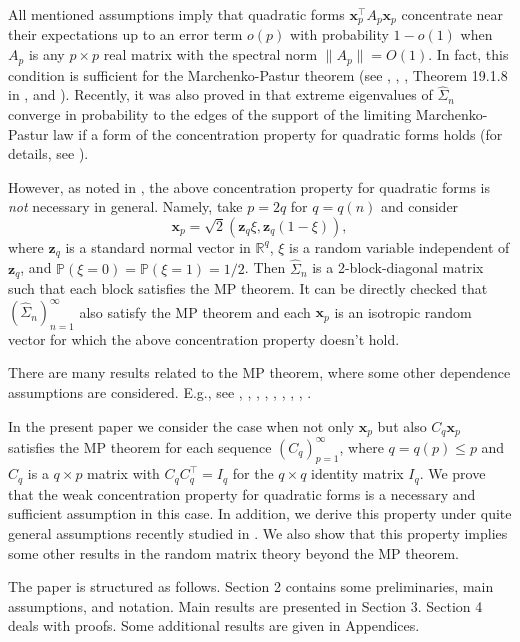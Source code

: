 \documentclass[12pt, a4paper]{article}
\newcommand\x{\mathbf x}
\newcommand\bR{{\mathbb R}}
\newcommand\z{{\mathbf z}}
\newcommand\wh{\widehat }
\newcommand\p{{\mathbb P}}
\begin{document}
All mentioned assumptions imply that quadratic forms $\x_p^\top A_p\x_p$ concentrate near their expectations up to an error term $o( p)$ with probability $1-o(1)$  when $A_p$ is any $p\times p$ real matrix with the spectral norm $\|A_p\|=O(1)$. In fact, this condition is sufficient for the Marchenko-Pastur theorem  (see \cite{BZ}, \cite{G}, \cite{PP}, Theorem 19.1.8 in \cite{PS}, and \cite{Y}).
Recently, it was also proved in \cite{CT} that extreme eigenvalues of $\wh\Sigma_n$ converge in probability to the edges of the  support of the limiting Marchenko-Pastur law if a form of the concentration property for quadratic forms holds (for details, see \cite{CT}). 


However, as noted in \cite{A}, the above concentration property for quadratic forms   is {\it not} necessary in general. Namely, take $p=2q$ for  $q=q(n)$ and consider \[\x_p=\sqrt{2}(\z_q \xi, \z_q (1-\xi)),\]
where $\z_q$ is a standard normal vector in $\bR^q$, $\xi$ is a random variable independent of $\z_q$,  and $\p(\xi=0)=\p(\xi=1)=1/2$. Then $\wh\Sigma_n$ is a 2-block-diagonal matrix such that each block satisfies the MP theorem. It can be directly checked that $(\wh\Sigma_n)_{n=1}^\infty$ also satisfy the MP theorem and  each $\x_p$ is an isotropic random vector for which the above concentration property doesn't hold.    

There are many results related to the MP theorem, where some other dependence assumptions are considered. E.g., see  \cite{A}, \cite{BM}, \cite{mp}, \cite{GNT},  \cite{PM}, \cite{MPP}, \cite{OR}, \cite{PSc}, \cite{Y}. 

   

In the present paper we consider the case when not only $\x_p$  but also $C_q\x_p$ satisfies  the MP theorem for each sequence $(C_q)_{p=1}^\infty$, where $q=q(p)\leqslant p$  and  $C_q$ is a $q\times p$ matrix with $C_qC_q^\top =I_q$ for the $q\times q$ identity matrix $I_q$. We prove that the weak concentration property for quadratic forms is a necessary and sufficient assumption in this case. In addition, we derive this property under quite general assumptions recently studied in \cite{PM}. We also show that this property implies some other results in the random matrix theory beyond the MP theorem.


The paper is structured as follows. Section 2 contains some preliminaries, main assumptions, and notation. Main results are presented in Section 3. Section 4 deals with proofs. Some additional results are given in Appendices.
 
\end{document}
